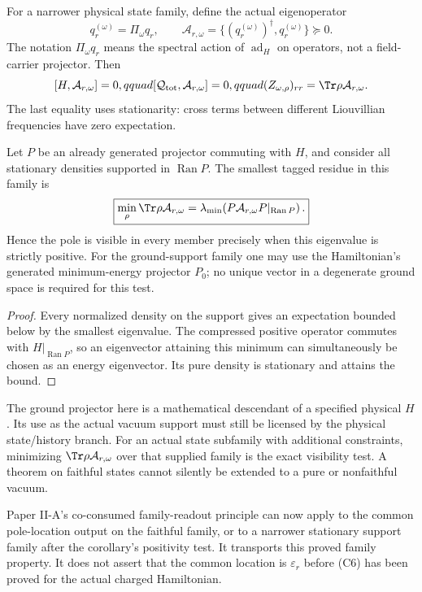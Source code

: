 \documentclass[12pt,a4paper]{article}
\begin{document}
For a narrower physical state family, define the actual eigenoperator
\[
 q_r^{(\omega)}=\Pi_\omega q_r,
 \qquad
 \mathcal A_{r,\omega}
 =\{(q_r^{(\omega)})^\dagger,q_r^{(\omega)}\}\succeq0.
\]
The notation $\Pi_\omega q_r$ means the spectral action of $\operatorname{ad}_H$ on
operators, not a field-carrier projector. Then
\[
 [H,\mathcal A_{r,\omega}]=0,qquad
 [\mathcal Q_{\rm tot},\mathcal A_{r,\omega}]=0,qquad
 (Z_{\omega,\rho})_{rr}=\Tr\rho\mathcal A_{r,\omega}.
\]
The last equality uses stationarity: cross terms between different
Liouvillian frequencies have zero expectation.

\begin{corollary}
\label{p4:cor:v2168-support-family-visibility}
Let $P$ be an already generated projector commuting with $H$, and consider
all stationary densities supported in $\operatorname{Ran}P$. The smallest
tagged residue in this family is
\[
 \boxed{\min_\rho\Tr\rho\mathcal A_{r,\omega}
 =\lambda_{\min}\!\left(P\mathcal A_{r,\omega}P
                               |_{\operatorname{Ran}P}\right).}
\]
Hence the pole is visible in every member precisely when this eigenvalue
is strictly positive. For the ground-support family one may use the
Hamiltonian's generated minimum-energy projector $P_0$; no unique vector
in a degenerate ground space is required for this test.
\end{corollary}
\begin{proof}
Every normalized density on the support gives an expectation bounded
below by the smallest eigenvalue. The compressed positive operator
commutes with $H|_{\operatorname{Ran}P}$, so an eigenvector attaining
this minimum can simultaneously be chosen as an energy eigenvector.
Its pure density is stationary and attains the bound.
\end{proof}

The ground projector here is a mathematical descendant of a specified
physical $H$. Its use as the actual vacuum support must still be licensed
by the physical state/history branch. For an actual state subfamily with
additional constraints, minimizing $\Tr\rho\mathcal A_{r,\omega}$ over
that supplied family is the exact visibility test. A theorem on faithful
states cannot silently be extended to a pure or nonfaithful vacuum.

Paper II-A's co-consumed family-readout principle can now apply to the
common pole-location output on the faithful family, or to a narrower
stationary support family after the corollary's positivity test.
It transports this proved family property. It does not assert that
the common location is $\varepsilon_r$ before (C6) has been proved for
the actual charged Hamiltonian.
\end{document}
